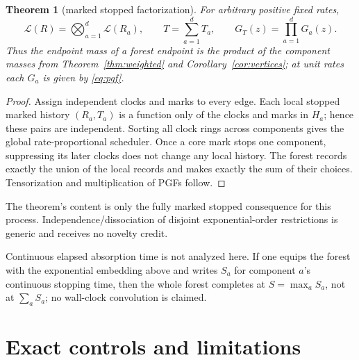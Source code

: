 \documentclass[10pt,a4paper]{amsart}
\newtheorem{theorem}{Theorem}[section]
\begin{document}
\begin{theorem}[marked stopped factorization]\label{thm:forest}
For arbitrary positive fixed rates,
\begin{equation}\label{eq:forest}
 \mathcal L(R)=\bigotimes_{a=1}^d\mathcal L(R_a),
 \qquad
 T=\sum_{a=1}^dT_a,
 \qquad
 G_T(z)=\prod_{a=1}^dG_a(z).
\end{equation}
Thus the endpoint mass of a forest endpoint is the product of the component
masses from Theorem~\ref{thm:weighted} and
Corollary~\ref{cor:vertices}; at unit rates each $G_a$ is given by
\eqref{eq:pgf}.
\end{theorem}

\begin{proof}
Assign independent clocks and marks to every edge.  Each local stopped marked
history $(R_a,T_a)$ is a function only of the clocks and marks in $H_a$;
hence these pairs are independent.  Sorting all clock rings across components
gives the global rate-proportional scheduler.  Once a core mark stops one
component, suppressing its later clocks does not change any local history.
The forest records exactly the union of the local records and makes exactly
the sum of their choices.  Tensorization and multiplication of PGFs follow.
\end{proof}

The theorem's content is only the fully marked stopped consequence for this
process.  Independence/dissociation of disjoint exponential-order
restrictions is generic and receives no novelty credit.

Continuous elapsed absorption time is not analyzed here.  If one equips the
forest with the exponential embedding above and writes $S_a$ for component
$a$'s continuous stopping time, then the whole forest completes at
$S=\max_a S_a$, not at $\sum_a S_a$; no wall-clock convolution is claimed.

\section{Exact controls and limitations}
\end{document}
